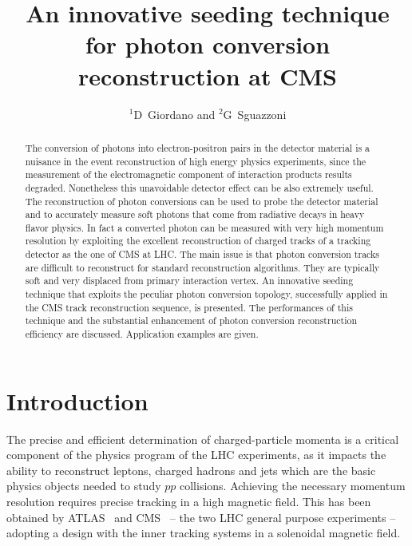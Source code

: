 \documentclass[a4paper]{jpconf}
\begin{document}
\title{An innovative seeding technique for photon conversion reconstruction at CMS}

\author{$^1$D~Giordano and $^2$G~Sguazzoni}

\address{$^1$CERN, Information Technology Department, Experiment Support Group, Geneva, Switzerland}
\address{$^2$INFN, Firenze, Italy}



\begin{abstract}
The conversion of photons into electron-positron pairs in the detector material is a nuisance in the event reconstruction of high energy physics experiments, since the measurement of the electromagnetic component of interaction products results degraded. Nonetheless this unavoidable detector effect can be also extremely useful. The reconstruction of photon conversions can be used to probe the detector material and to accurately measure soft photons that come from radiative decays in heavy flavor physics. In fact a converted photon can be measured with very high momentum resolution by exploiting the excellent reconstruction of charged tracks of a tracking detector as the one of CMS at LHC. The main issue is that photon conversion tracks are difficult to reconstruct for standard reconstruction algorithms. They are typically soft and very displaced from primary interaction vertex. An innovative seeding technique that exploits the peculiar photon conversion topology, successfully applied in the CMS track reconstruction sequence, is presented. The performances of this technique and the substantial enhancement of photon conversion reconstruction efficiency are discussed. Application examples are given.
\end{abstract}


\section{Introduction}
\label{introductions}

The precise and efficient determination of charged-particle momenta is a
critical component of the physics program of the LHC experiments, 
as it impacts the ability to
reconstruct leptons, charged hadrons and jets which
are the basic physics objects needed to study $pp$ collisions.
Achieving the necessary momentum resolution requires precise tracking in a high magnetic field. This has been obtained by ATLAS~\cite{atlas} and CMS~\cite{cms} -- the two LHC general purpose experiments  --  adopting a design with the inner tracking systems in a solenoidal magnetic field.
\end{document}
